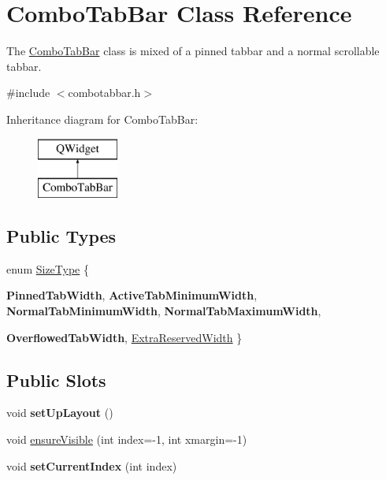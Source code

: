 \hypertarget{class_combo_tab_bar}{
\section{ComboTabBar Class Reference}
\label{class_combo_tab_bar}
}


The \hyperlink{class_combo_tab_bar}{ComboTabBar} class is mixed of a pinned tabbar and a normal scrollable tabbar.  




{\ttfamily \#include $<$combotabbar.h$>$}

Inheritance diagram for ComboTabBar:\begin{figure}[H]
\begin{center}
\leavevmode
\includegraphics[height=2cm]{class_combo_tab_bar}
\end{center}
\end{figure}
\subsection*{Public Types}
\begin{DoxyCompactItemize}
\item 
enum \hyperlink{class_combo_tab_bar_a1b4d1e5b7dbc95dcf040b481e00760bc}{SizeType} \{ \par
{\bfseries PinnedTabWidth}, 
{\bfseries ActiveTabMinimumWidth}, 
{\bfseries NormalTabMinimumWidth}, 
{\bfseries NormalTabMaximumWidth}, 
\par
{\bfseries OverflowedTabWidth}, 
\hyperlink{class_combo_tab_bar_a1b4d1e5b7dbc95dcf040b481e00760bcaad4e405225830026a514d146b600b955}{ExtraReservedWidth}
 \}
\end{DoxyCompactItemize}
\subsection*{Public Slots}
\begin{DoxyCompactItemize}
\item 
\hypertarget{class_combo_tab_bar_a9cacd6e9340dfff7f356ad28b9e71030}{
void {\bfseries setUpLayout} ()}
\label{class_combo_tab_bar_a9cacd6e9340dfff7f356ad28b9e71030}

\item 
void \hyperlink{class_combo_tab_bar_a67abbf211f68ffe53c10654311a95621}{ensureVisible} (int index=-\/1, int xmargin=-\/1)
\item 
\hypertarget{class_combo_tab_bar_af87d91e7b17e8d5f192f7f0b89c26047}{
void {\bfseries setCurrentIndex} (int index)}
\label{class_combo_tab_bar_af87d91e7b17e8d5f192f7f0b89c26047}

\end{DoxyCompactItemize}
